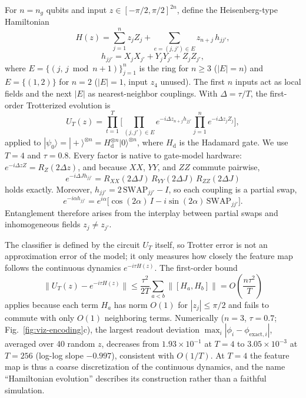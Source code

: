 \documentclass[conference]{IEEEtran}
\begin{document}
For $n=n_g$ qubits and input $z\in[-\pi/2,\pi/2]^{2n}$, define the Heisenberg-type Hamiltonian
\begin{equation}
    H(z)=\sum_{j=1}^{n}z_jZ_j+\sum_{e=(j,j')\in E}z_{n+j}\,h_{jj'},
    \label{eq:hamiltonian}
\end{equation}
\begin{equation}
    h_{jj'}=X_jX_{j'}+Y_jY_{j'}+Z_jZ_{j'},
\end{equation}
where $E=\{(j,\,j\bmod n+1)\}_{j=1}^{n}$ is the ring for $n\ge3$ ($|E|=n$) and $E=\{(1,2)\}$ for $n=2$ ($|E|=1$, input $z_4$ unused). The first $n$ inputs act as local fields and the next $|E|$ as nearest-neighbor couplings. With $\Delta=\tau/T$, the first-order Trotterized evolution is
\begin{equation}
    U_T(z)=\prod_{t=1}^{T}\Bigg[\prod_{(j,j')\in E}e^{-i\Delta z_{n+j}h_{jj'}}\prod_{j=1}^{n}e^{-i\Delta z_jZ_j}\Bigg],
    \label{eq:trotter}
\end{equation}
applied to $|\psi_0\rangle=|{+}\rangle^{\otimes n}=H_{\mathrm{d}}^{\otimes n}|0\rangle^{\otimes n}$, where $H_{\mathrm{d}}$ is the Hadamard gate. We use $T=4$ and $\tau=0.8$. Every factor is native to gate-model hardware: $e^{-i\Delta z Z}=R_Z(2\Delta z)$, and because $XX$, $YY$, and $ZZ$ commute pairwise,
\begin{equation}
    e^{-i\Delta J h_{jj'}}=R_{XX}(2\Delta J)\,R_{YY}(2\Delta J)\,R_{ZZ}(2\Delta J)
\end{equation}
holds exactly. Moreover, $h_{jj'}=2\,\mathrm{SWAP}_{jj'}-I$, so each coupling is a partial swap,
\begin{equation}
    e^{-i\alpha h_{jj'}}=e^{i\alpha}\big[\cos(2\alpha)\,I-i\sin(2\alpha)\,\mathrm{SWAP}_{jj'}\big].
    \label{eq:partial-swap}
\end{equation}
Entanglement therefore arises from the interplay between partial swaps and inhomogeneous fields $z_j\neq z_{j'}$.

The classifier is defined by the circuit $U_T$ itself, so Trotter error is not an approximation error of the model; it only measures how closely the feature map follows the continuous dynamics $e^{-i\tau H(z)}$. The first-order bound~\cite{lloyd1996,childs2021trotter}
\begin{equation}
    \big\|U_T(z)-e^{-i\tau H(z)}\big\|\le\frac{\tau^2}{2T}\sum_{a<b}\big\|[H_a,H_b]\big\|=O\!\left(\frac{n\tau^2}{T}\right)
    \label{eq:trotter-error}
\end{equation}
applies because each term $H_a$ has norm $O(1)$ for $|z_j|\le\pi/2$ and fails to commute with only $O(1)$ neighboring terms.
Numerically ($n=3$, $\tau=0.7$; Fig.~\ref{fig:viz-encoding}c), the largest readout deviation $\max_i|\phi_i-\phi_{\mathrm{exact},i}|$, averaged over 40 random $z$, decreases from $1.93\times10^{-1}$ at $T=4$ to $3.05\times10^{-3}$ at $T=256$ (log-log slope $-0.997$), consistent with $O(1/T)$. At $T=4$ the feature map is thus a coarse discretization of the continuous dynamics, and the name ``Hamiltonian evolution'' describes its construction rather than a faithful simulation.
\end{document}

